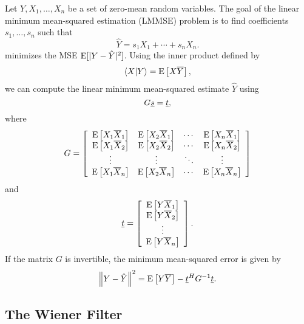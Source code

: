 Let $Y, X_1, \ldots, X_n$ be a set of zero-mean random variables.
The goal of the linear minimum mean-squared estimation (LMMSE) problem is to find coefficients $s_1, \ldots, s_n$ such that
\[ \hat{Y} = s_1 X_1 + \cdots + s_n X_n. \]
minimizes the MSE $\mathrm{E}[|Y-\hat{Y}|^2]$.
Using the inner product defined by
\begin{equation} \label{equation:ExpectationInnerProduct}
\left\langle X | Y \right\rangle = \mathrm{E} \left[ X \overline{Y} \right],
\end{equation}
we can compute the linear minimum mean-squared estimate $\hat{Y}$ using
\begin{equation*}
G \underline{s} = \underline{t},
\end{equation*}
where
\begin{equation*}
G = \left[ \begin{array}{cccc}
\mathrm{E} \left[ X_1 \overline{X}_1 \right]
& \mathrm{E} \left[ X_2 \overline{X}_1 \right] & \cdots
& \mathrm{E} \left[ X_n \overline{X}_1 \right] \\
\mathrm{E} \left[ X_1 \overline{X}_2 \right]
& \mathrm{E} \left[ X_2 \overline{X}_2 \right] & \cdots
& \mathrm{E} \left[ X_n \overline{X}_2 \right] \\
\vdots & \vdots & \ddots & \vdots \\
\mathrm{E} \left[ X_1 \overline{X}_n \right]
& \mathrm{E} \left[ X_2 \overline{X}_n \right] & \cdots
& \mathrm{E} \left[ X_n \overline{X}_n \right] \\
\end{array} \right]
\end{equation*}
and
\begin{equation*}
\underline{t} = \left[ \begin{array}{c}
\mathrm{E} \left[ Y \overline{X}_1 \right] \\
\mathrm{E} \left[ Y \overline{X}_2 \right] \\ \vdots \\
\mathrm{E} \left[ Y \overline{X}_n \right] \end{array} \right] .
\end{equation*}
If the matrix $G$ is invertible, the minimum mean-squared error is given by
\begin{equation*}
\left\| Y - \hat{Y} \right\|^2 = \mathrm{E} \left[ Y \overline{Y} \right]
- \underline{t}^H G^{-1} \underline{t} .
\end{equation*}


\subsection{The Wiener Filter}

